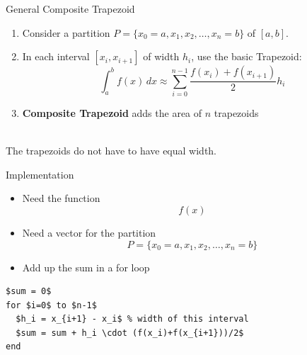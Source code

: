 \documentclass[10pt]{beamer}
\begin{document}
\begin{frame}{General Composite Trapezoid}
   \begin{enumerate}
      \item Consider a partition $P=\{x_0=a, x_1, x_2, \dots, x_n = b\}$ of $[a,b]$.

      \item In each interval $[x_i,x_{i+1}]$ of width $h_i$, use the basic Trapezoid:
            \begin{equation*}
              \int_a^b f(x)\,dx \approx \sum_{i=0}^{n-1}
            \frac{f(x_i)+f(x_{i+1})}{2} h_i 
            \end{equation*}
        \item \textbf{Composite Trapezoid} adds the area of $n$ trapezoids
   \end{enumerate}
   
   \begin{center}
    \\
The trapezoids do not have to have equal width.
\end{center}
\end{frame}

\begin{frame}[fragile]{Implementation}

\begin{itemize}
    
    \item Need the function 
    $$f(x)$$
    \item Need a vector for the partition 
    $$P=\{x_0=a, x_1, x_2, \dots, x_n = b\}$$
    
    \item Add up the sum in a for loop
\end{itemize}
\begin{lstlisting}[mathescape]
$sum = 0$
for $i=0$ to $n-1$
  $h_i = x_{i+1} - x_i$ % width of this interval
  $sum = sum + h_i \cdot (f(x_i)+f(x_{i+1}))/2$
end
\end{lstlisting}
\end{frame}
\end{document}
